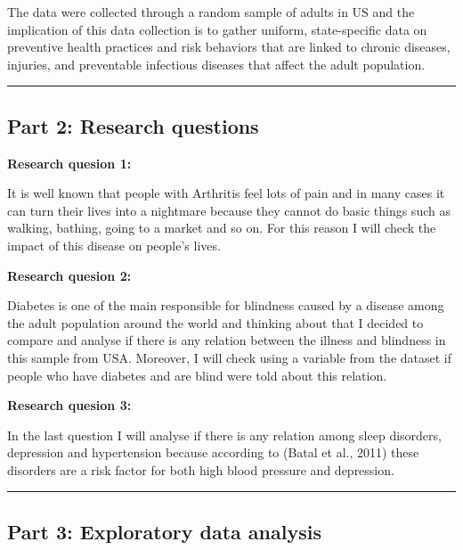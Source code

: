 \documentclass[
]{article}
\begin{document}
The data were collected through a random sample of adults in US and the
implication of this data collection is to gather uniform, state-specific
data on preventive health practices and risk behaviors that are linked
to chronic diseases, injuries, and preventable infectious diseases that
affect the adult population.

\begin{center}\rule{0.5\linewidth}{0.5pt}\end{center}

\hypertarget{part-2-research-questions}{%
\subsection{Part 2: Research
questions}\label{part-2-research-questions}}

\textbf{Research quesion 1:}

It is well known that people with Arthritis feel lots of pain and in
many cases it can turn their lives into a nightmare because they cannot
do basic things such as walking, bathing, going to a market and so on.
For this reason I will check the impact of this disease on people's
lives.

\textbf{Research quesion 2:}

Diabetes is one of the main responsible for blindness caused by a
disease among the adult population around the world and thinking about
that I decided to compare and analyse if there is any relation between
the illness and blindness in this sample from USA. Moreover, I will
check using a variable from the dataset if people who have diabetes and
are blind were told about this relation.

\textbf{Research quesion 3:}

In the last question I will analyse if there is any relation among sleep
disorders, depression and hypertension because according to (Batal et
al., 2011) these disorders are a risk factor for both high blood
pressure and depression.

\begin{center}\rule{0.5\linewidth}{0.5pt}\end{center}

\hypertarget{part-3-exploratory-data-analysis}{%
\subsection{Part 3: Exploratory data
analysis}\label{part-3-exploratory-data-analysis}}
\end{document}
